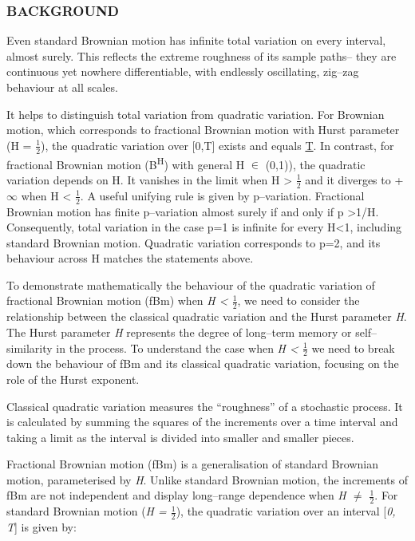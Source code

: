 \documentclass[12pt,a4paper]{report}
\numberwithin{equation}{section}
\begin{document}
\hypertarget{background}{%
\subsubsection{BACKGROUND}\label{background}}

Even standard Brownian motion has infinite total variation on every
interval, almost surely. This reflects the extreme roughness of its
sample paths-- they are continuous yet nowhere differentiable, with
endlessly oscillating, zig--zag behaviour at all scales.

It helps to distinguish total variation from quadratic variation. For
Brownian motion, which corresponds to fractional Brownian motion with
Hurst parameter (H = $\frac{1}{2}$), the quadratic variation over {[}0,T{]} exists
and equals \uline{T}. In contrast, for fractional Brownian motion
(B\textsuperscript{H}) with general H $\in$ (0,1)), the quadratic variation
depends on H. It vanishes in the limit when H \textgreater{} $\frac{1}{2}$ and it
diverges to +$\infty$ when H \textless{} $\frac{1}{2}$. A useful unifying rule is given by
p--variation. Fractional Brownian motion has finite p--variation almost
surely if and only if p \textgreater1/H. Consequently, total variation
in the case p=1 is infinite for every H\textless1, including standard
Brownian motion. Quadratic variation corresponds to p=2, and its
behaviour across H matches the statements above.

To demonstrate mathematically the behaviour of the quadratic variation
of fractional Brownian motion (fBm) when \emph{H \textless{} $\frac{1}{2}$}, we need
to consider the relationship between the classical quadratic variation
and the Hurst parameter \emph{H}. The Hurst parameter \emph{H}
represents the degree of long--term memory or self--similarity in the
process. To understand the case when \emph{H \textless{} $\frac{1}{2}$} we need to
break down the behaviour of fBm and its classical quadratic variation,
focusing on the role of the Hurst exponent.

Classical quadratic variation measures the ``roughness'' of a stochastic
process. It is calculated by summing the squares of the increments over
a time interval and taking a limit as the interval is divided into
smaller and smaller pieces.

Fractional Brownian motion (fBm) is a generalisation of standard
Brownian motion, parameterised by \emph{H}. Unlike standard Brownian
motion, the increments of fBm are not independent and display long--range
dependence when \emph{H $\neq$ $\frac{1}{2}$}. For standard Brownian motion (\emph{H =
$\frac{1}{2}$}), the quadratic variation over an interval {[}\emph{0, T}{]} is given
by:
\end{document}
